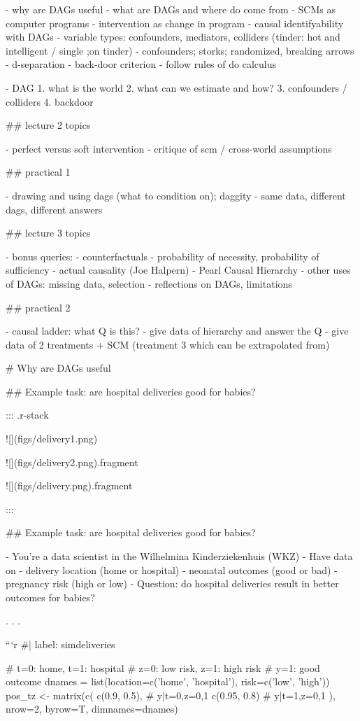 - why are DAGs useful
- what are DAGs and where do come from 
- SCMs as computer programs
  - intervention as change in program
- causal identifyability with DAGs
  - variable types: confounders, mediators, colliders (tinder: hot and intelligent / single ;on tinder)
    - confounders; storks; randomized, breaking arrows
  - d-separation
  - back-door criterion
  - follow rules of do calculus


-  DAG
  1. what is the world
  2. what can we estimate and how?
  3. confounders / colliders
  4. backdoor
 
## lecture 2 topics

  - perfect versus soft intervention
  - critique of scm / cross-world assumptions

## practical 1

  - drawing and using dags (what to condition on); daggity
  - same data, different dags, different answers

## lecture 3 topics

  - bonus queries:
    - counterfactuals
    - probability of necessity, probability of sufficiency
    - actual causality (Joe Halpern)
  - Pearl Causal Hierarchy
  - other uses of DAGs: missing data, selection
  - reflections on DAGs, limitations

## practical 2

  - causal ladder: what Q is this?
  - give data of hierarchy and answer the Q
  - give data of 2 treatments + SCM (treatment 3 which can be extrapolated from)

# Why are DAGs useful

## Example task: are hospital deliveries good for babies?

::: {.r-stack}

![](figs/delivery1.png)

![](figs/delivery2.png){.fragment}

![](figs/delivery.png){.fragment}

:::

## Example task: are hospital deliveries good for babies?

- You're a data scientist in the Wilhelmina Kinderziekenhuis (WKZ)
- Have data on
  - delivery location (home or hospital)
  - neonatal outcomes (good or bad)
  - pregnancy risk (high or low)
- Question: do hospital deliveries result in better outcomes for babies?

. . .

```{r}
#| label: simdeliveries

# t=0: home, t=1: hospital
# z=0: low risk, z=1: high risk
# y=1: good outcome
dnames = list(location=c('home', 'hospital'), risk=c('low', 'high'))
pos_tz <- matrix(c(
  c(0.9,  0.5), # y|t=0,z=0,1
  c(0.95, 0.8)  # y|t=1,z=0,1
), nrow=2, byrow=T,
dimnames=dnames)

